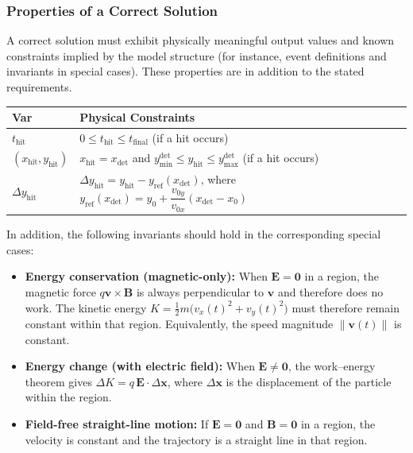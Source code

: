 \documentclass[12pt]{article}
\begin{document}
\subsubsection{Properties of a Correct Solution} \label{sec_CorrectSolution}

\noindent
A correct solution must exhibit physically meaningful output values and known
constraints implied by the model structure (for instance, event definitions and
invariants in special cases). These properties are in addition to the stated
requirements.

\begin{table}[!h]
\caption{Output Data Constraints} \label{TblOutputVar}
\renewcommand{\arraystretch}{1.2}
\noindent \begin{longtable*}{l l}
  \toprule
  \textbf{Var} & \textbf{Physical Constraints} \\
  \midrule
  $t_{\mathrm{hit}}$ &
  $0 \le t_{\mathrm{hit}} \le t_{\text{final}}$ (if a hit occurs)
  \\
  $(x_{\mathrm{hit}},y_{\mathrm{hit}})$ &
  $x_{\mathrm{hit}} = x_{\mathrm{det}}$ and
  $y^{\mathrm{det}}_{\min} \le y_{\mathrm{hit}} \le y^{\mathrm{det}}_{\max}$ (if a hit occurs)
  \\
  $\Delta y_{\mathrm{hit}}$ &
  $\Delta y_{\mathrm{hit}} = y_{\mathrm{hit}} - y_{\mathrm{ref}}(x_{\mathrm{det}})$, where
  $y_{\mathrm{ref}}(x_{\mathrm{det}})= y_0 + \dfrac{v_{0y}}{v_{0x}}(x_{\mathrm{det}}-x_0)$
  \\
  \bottomrule
\end{longtable*}
\end{table}

\noindent
In addition, the following invariants should hold in the corresponding special
cases:
\begin{itemize}
\item \textbf{Energy conservation (magnetic-only):} When $\mathbf{E}=\mathbf{0}$ in a region,
  the magnetic force $q\mathbf{v}\times\mathbf{B}$ is always perpendicular to $\mathbf{v}$
  and therefore does no work. The kinetic energy
  $K = \tfrac{1}{2}m\bigl(v_x(t)^2 + v_y(t)^2\bigr)$
  must therefore remain constant within that region.
  Equivalently, the speed magnitude $\|\mathbf{v}(t)\|$ is constant.
\item \textbf{Energy change (with electric field):} When $\mathbf{E}\neq\mathbf{0}$, the
  work--energy theorem gives $\Delta K = q\,\mathbf{E}\cdot\Delta\mathbf{x}$, where
  $\Delta\mathbf{x}$ is the displacement of the particle within the region.
\item \textbf{Field-free straight-line motion:} If $\mathbf{E}=\mathbf{0}$ and
  $\mathbf{B}=\mathbf{0}$ in a region, the velocity is constant and the trajectory
  is a straight line in that region.
\end{itemize}
\end{document}
